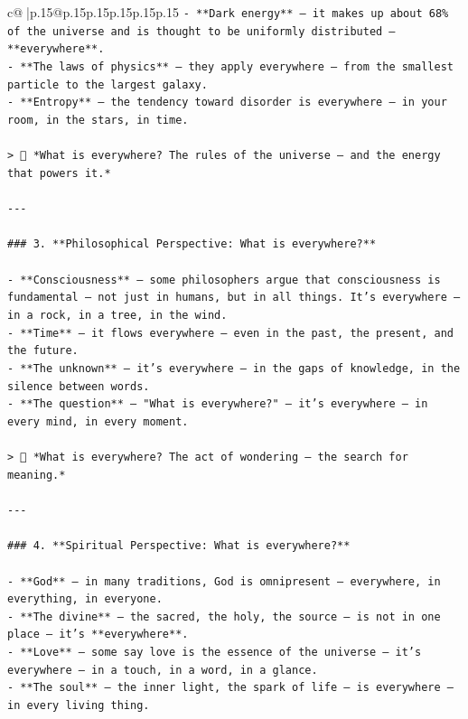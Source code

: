 \documentclass{article}
\begin{document}
{\begin{supertabular}{c@{$\;$}|p{.15\linewidth}@{}p{.15\linewidth}p{.15\linewidth}p{.15\linewidth}p{.15\linewidth}p{.15\linewidth}}
{{{\texttt{{-} **Dark energy** — it makes up about 68\% of the universe and is thought to be uniformly distributed — **everywhere**.} \\
\texttt{{-} **The laws of physics** — they apply everywhere — from the smallest particle to the largest galaxy.} \\
\texttt{{-} **Entropy** — the tendency toward disorder is everywhere — in your room, in the stars, in time.} \\
\\ 
\texttt{> 🧪 *What is everywhere? The rules of the universe — and the energy that powers it.*} \\
\\ 
\texttt{{-}{-}{-}} \\
\\ 
\texttt{\#\#\# 3. **Philosophical Perspective: What is everywhere?**} \\
\\ 
\texttt{{-} **Consciousness** — some philosophers argue that consciousness is fundamental — not just in humans, but in all things. It’s everywhere — in a rock, in a tree, in the wind.} \\
\texttt{{-} **Time** — it flows everywhere — even in the past, the present, and the future.} \\
\texttt{{-} **The unknown** — it’s everywhere — in the gaps of knowledge, in the silence between words.} \\
\texttt{{-} **The question** — "What is everywhere?" — it’s everywhere — in every mind, in every moment.} \\
\\ 
\texttt{> 🧠 *What is everywhere? The act of wondering — the search for meaning.*} \\
\\ 
\texttt{{-}{-}{-}} \\
\\ 
\texttt{\#\#\# 4. **Spiritual Perspective: What is everywhere?**} \\
\\ 
\texttt{{-} **God** — in many traditions, God is omnipresent — everywhere, in everything, in everyone.} \\
\texttt{{-} **The divine** — the sacred, the holy, the source — is not in one place — it’s **everywhere**.} \\
\texttt{{-} **Love** — some say love is the essence of the universe — it’s everywhere — in a touch, in a word, in a glance.} \\
\texttt{{-} **The soul** — the inner light, the spark of life — is everywhere — in every living thing.} \\
}}}
\end{supertabular}}
\end{document}
